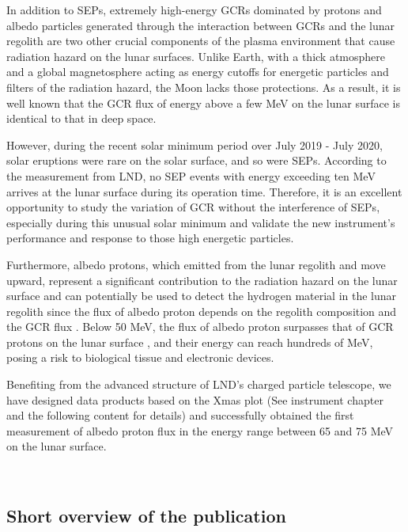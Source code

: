 
In addition to \acp{SEP}, extremely high-energy \acp{GCR} dominated by protons and albedo particles generated through the interaction between \acp{GCR} and the lunar regolith are two other crucial components of the plasma environment that cause radiation hazard on the lunar surfaces.
Unlike Earth, with a thick atmosphere and a global magnetosphere acting as energy cutoffs for energetic particles and filters of the radiation hazard, the Moon lacks those protections. As a result, it is well known that the \ac{GCR} flux of energy above a few MeV on the lunar surface is identical to that in deep space.

However, during the recent solar minimum period over July 2019 - July 2020, solar eruptions were rare on the solar surface, and so were \acp{SEP}. According to the measurement from \ac{LND}, no \ac{SEP} events with energy exceeding ten MeV arrives at the lunar surface during its operation time.
Therefore, it is an excellent opportunity to study the variation of \acs{GCR} without the interference of \acp{SEP}, especially during this unusual solar minimum \citep{Strauss2023ApJ, Fu2021ApJS} and validate the new instrument's performance and response to those high energetic particles.    

Furthermore, albedo protons, which emitted from the lunar regolith and move upward, represent a significant contribution to the radiation hazard on the lunar surface and can potentially be used to detect the hydrogen material in the lunar regolith since the flux of albedo proton depends on the regolith composition and the \ac{GCR} flux \citep{Schwadron2016Icarus}.
Below 50 MeV, the flux of albedo proton surpasses that of \ac{GCR} protons on the lunar surface \citep{Dobynde2021JGRE, Wimmer2020SSRv}, and their energy can reach hundreds of MeV, posing a risk to biological tissue and electronic devices.

Benefiting from the advanced structure of \ac{LND}'s charged particle telescope, we have designed data products based on the Xmas plot (See instrument chapter and the following content for details) and successfully obtained the first measurement of albedo proton flux in the energy range between 65 and 75 MeV on the lunar surface.

\\


\subsection*{Short overview of the publication}\\

